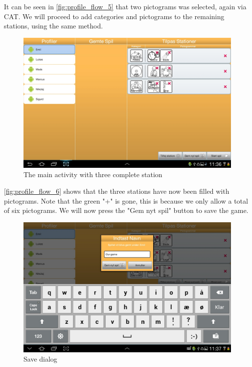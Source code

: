 It can be seen in \autoref{fig:profile_flow_5} that two pictograms was selected, again via CAT.  We will proceed to add categories and pictograms to the remaining stations, using the same method.

\begin{figure}[H]
\centering
\includegraphics[width=0.9\linewidth]{img/screenshots/profile_flow_6.jpg}%
\caption{The main activity with three complete station}
\label{fig:profile_flow_6}
\end{figure}

\autoref{fig:profile_flow_6} shows that the three stations have now been filled with pictograms. Note that the green "+" is gone, this is because we only allow a total of six pictograms. We will now press the "Gem nyt spil" button to save the game.

\begin{figure}[H]
\centering
\includegraphics[width=0.9\linewidth]{img/screenshots/profile_flow_7.jpg}%
\caption{Save dialog}
\label{fig:profile_flow_7}
\end{figure}

